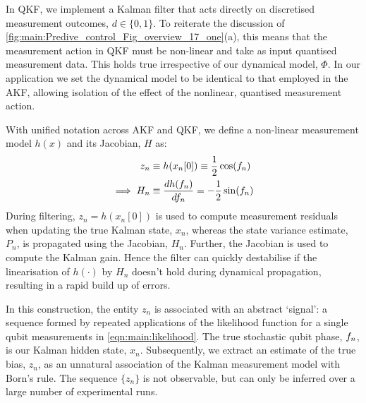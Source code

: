 In QKF, we implement a Kalman filter that acts directly on discretised measurement outcomes, $d \in \{0,1\}$. To reiterate the discussion of  \cref{fig:main:Predive_control_Fig_overview_17_one}(a), this means that the measurement action in QKF must be non-linear and take as input quantised measurement data. This holds true irrespective of our dynamical model, $\Phi$.  In our application we set the dynamical model to be identical to that employed in the AKF, allowing isolation of the effect of the nonlinear, quantised measurement action.

With unified notation across AKF and QKF, we define a non-linear measurement model $h(x)$ and its Jacobian, $H$ as:
\begin{align}
z_n &  \equiv h(x_n[0]) \equiv \frac{1}{2}\cos(f_{n}) \\
\implies H_n &\equiv \frac{d h(f_n)}{df_n} =  -\frac{1}{2}\sin(f_{n})
\end{align}
During filtering, $z_n = h(x_n[0])$ is used to compute measurement residuals when updating the true Kalman state, $x_n$, whereas the state variance estimate, $P_n$, is propagated using the Jacobian, $H_n$. Further, the Jacobian  is used to compute the Kalman gain. Hence the filter can quickly destabilise if the linearisation of $h(\cdot)$ by $H_n$ doesn't hold during dynamical propagation, resulting in a rapid build up of errors. 

In this construction, the entity $z_n$ is associated with an abstract `signal': a sequence formed by repeated applications of the likelihood function for a single qubit measurements in \cref{eqn:main:likelihood}.  The true stochastic qubit phase, $f_n$, is our Kalman hidden state, $x_n$. Subsequently, we extract an estimate of the true bias, $z_n$, as an unnatural association of the Kalman measurement model with Born's rule. The sequence $\{z_n\}$ is not observable, but can only be inferred over a large number of experimental runs. 

